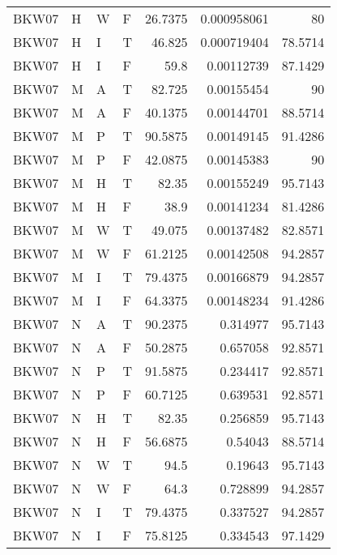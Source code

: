 \begin{table}[!htb]
{\begin{tabular}{llllrrr}
            BKW07    & H     & W     & F          & 26.7375    & 0.000958061 & 80       \\
            BKW07    & H     & I     & T          & 46.825     & 0.000719404 & 78.5714  \\
            BKW07    & H     & I     & F          & 59.8       & 0.00112739  & 87.1429  \\
            BKW07    & M     & A     & T          & 82.725     & 0.00155454  & 90       \\
            BKW07    & M     & A     & F          & 40.1375    & 0.00144701  & 88.5714  \\
            BKW07    & M     & P     & T          & 90.5875    & 0.00149145  & 91.4286  \\
            BKW07    & M     & P     & F          & 42.0875    & 0.00145383  & 90       \\
            BKW07    & M     & H     & T          & 82.35      & 0.00155249  & 95.7143  \\
            BKW07    & M     & H     & F          & 38.9       & 0.00141234  & 81.4286  \\
            BKW07    & M     & W     & T          & 49.075     & 0.00137482  & 82.8571  \\
            BKW07    & M     & W     & F          & 61.2125    & 0.00142508  & 94.2857  \\
            BKW07    & M     & I     & T          & 79.4375    & 0.00166879  & 94.2857  \\
            BKW07    & M     & I     & F          & 64.3375    & 0.00148234  & 91.4286  \\
            BKW07    & N     & A     & T          & 90.2375    & 0.314977    & 95.7143  \\
            BKW07    & N     & A     & F          & 50.2875    & 0.657058    & 92.8571  \\
            BKW07    & N     & P     & T          & 91.5875    & 0.234417    & 92.8571  \\
            BKW07    & N     & P     & F          & 60.7125    & 0.639531    & 92.8571  \\
            BKW07    & N     & H     & T          & 82.35      & 0.256859    & 95.7143  \\
            BKW07    & N     & H     & F          & 56.6875    & 0.54043     & 88.5714  \\
            BKW07    & N     & W     & T          & 94.5       & 0.19643     & 95.7143  \\
            BKW07    & N     & W     & F          & 64.3       & 0.728899    & 94.2857  \\
            BKW07    & N     & I     & T          & 79.4375    & 0.337527    & 94.2857  \\
            BKW07    & N     & I     & F          & 75.8125    & 0.334543    & 97.1429  \\
            \hline
        \end{tabular}
    }{}
\end{table}